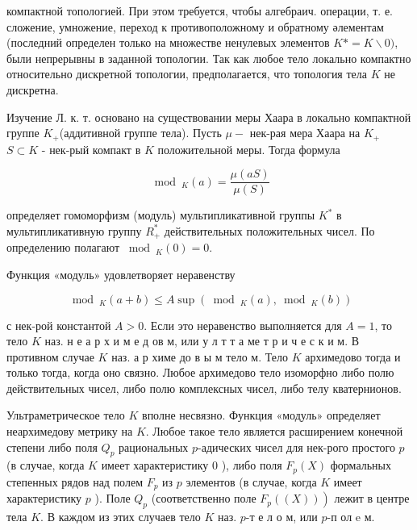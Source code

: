 \documentclass[10pt]{article}
\begin{document}
компактной топологией. При этом требуется, чтобы алгебраич. операции, т. е. сложение, умножение, переход к противоположному и обратному әлементам (последний определен только на множестве ненулевых элементов $K *=K \backslash 0)$, были непрерывны в заданной топологии. Так как любое тело локально компактно относительно дискретной топологии, предполагается, что топология тела $K$ не дискретна.



Изучение Л. к. т. основано на существовании меры Хаара в локально компактной группе $K_{+}$(аддитивной группе тела). Пусть $\mu-$ нек-рая мера Хаара на $K_{+}$ $S \subset K$ - нек-рый компакт в $K$ положительной меры. Тогда формула



\[

\bmod _{K}(a)=\frac{\mu(a S)}{\mu(S)}

\]



определяет гомоморфизм (модуль) мультипликативной группы $K^{*}$ в мультипликативную группу $R_{+}^{*}$ действительных положительных чисел. По определению полагают $\bmod _{K}(0)=0$.



Функция «модуль» удовлетворяет неравенству



\[

\bmod _{K}(a+b) \leqslant A \sup \left(\bmod _{K}(a), \bmod _{K}(b)\right)

\]



с нек-рой константой $A>0$. Если это неравенство выполняется для $A=1$, то тело $K$ наз. н е а р х и м е д ов м, или у л т т а ме т р и ч е с к и м. В противном случае $K$ наз. а р химе до в ы м тело м. Тело $K$ архимедово тогда и только тогда, когда оно связно. Любое архимедово тело изоморфно либо полю действительных чисел, либо полю комплексных чисел, либо телу кватернионов.



Ультраметрическое тело $K$ вполне несвязно. Функция «модуль» определяет неархимедову метрику на $K$. Любое такое тело является расширением конечной степени либо поля $Q_{p}$ рациональных $p$-адических чисел для нек-рого простого $p$ (в случае, когда $K$ имеет характеристику 0 ), либо поля $F_{p}(X)$ формальных степенных рядов над полем $F_{p}$ из $p$ элементов (в случае, когда $K$ имеет характеристику $p$ ). Поле $Q_{p}$ (соответственно поле $\left.F_{p}((X))\right)$ лежит в центре тела $K$. В каждом из этих случаев тело $K$ наз. $p$-т е л о м, или $p$-п ол e м.
\end{document}
